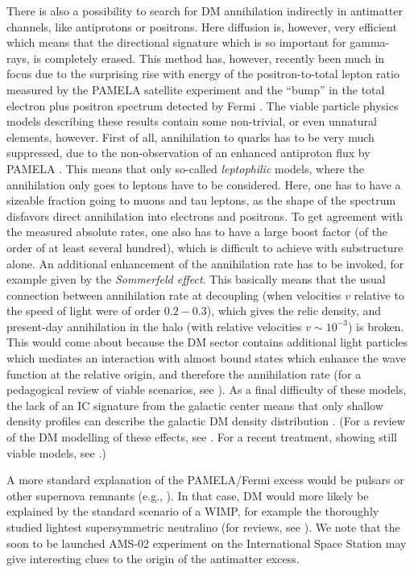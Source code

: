 \documentclass[10pt,aps,pra,reprint,amsmath,amsfonts,amssymb,showpacs,nofootinbib,floatfix]{revtex4-1}
\begin{document}
There is also a possibility to search for DM annihilation indirectly
in antimatter channels, like antiprotons or positrons. Here diffusion
is, however, very efficient which means that the directional signature
which is so important for gamma-rays, is completely erased. This
method has, however, recently been much in focus due to the surprising
rise with energy of the positron-to-total lepton ratio measured by the
PAMELA satellite experiment \cite{Adriani:2008zr} and the ``bump'' in
the total electron plus positron spectrum detected by Fermi
\cite{Abdo:2009zk}. The viable particle physics models describing
these results contain some non-trivial, or even unnatural elements,
however. First of all, annihilation to quarks has to be very much
suppressed, due to the non-observation of an enhanced antiproton flux
by PAMELA \cite{Adriani:2010rc}. This means that only so-called {\em
  leptophilic} models, where the annihilation only goes to leptons
have to be considered. Here, one has to have a sizeable fraction going
to muons and tau leptons, as the shape of the spectrum disfavors
direct annihilation into electrons and positrons. To get agreement
with the measured absolute rates, one also has to have a large boost
factor (of the order of at least several hundred), which is difficult
to achieve with substructure alone. An additional enhancement of the
annihilation rate has to be invoked, for example given by the {\em
  Sommerfeld effect}. This basically means that the usual connection
between annihilation rate at decoupling (when velocities $v$ relative
to the speed of light were of order $0.2 - 0.3$), which gives the
relic density, and present-day annihilation in the halo (with relative
velocities $v\sim 10^{-3}$) is broken. This would come about because
the DM sector contains additional light particles which mediates an
interaction with almost bound states which enhance the wave function
at the relative origin, and therefore the annihilation rate (for a
pedagogical review of viable scenarios, see
\cite{ArkaniHamed:2008qn}). As a final difficulty of these models, the
lack of an IC signature from the galactic center means that only
shallow density profiles can describe the galactic DM density
distribution
\cite{Bertone:2008xr,Cirelli:2008pk,Bergstrom:2008ag}. (For a review
of the DM modelling of these effects, see \cite{Bergstrom:2009ib}. For
a recent treatment, showing still viable models, see
\cite{Finkbeiner:2010sm}.)

A more standard explanation of the PAMELA/Fermi excess would be
pulsars or other supernova remnants (e.g.,
\cite{1995PhRvD..52.3265A,Hooper:2008kg,Ahlers:2009ae}). In that case,
DM would more likely be explained by the standard scenario of a WIMP,
for example the thoroughly studied lightest supersymmetric neutralino
(for reviews, see
\cite{Jungman:1995df,Bergstrom:2000pn,Bertone:2004pz}). We note that
the soon to be launched AMS-02 experiment on the International Space
Station \cite{ams02} may give interesting clues to the origin of the
antimatter excess.
\end{document}
